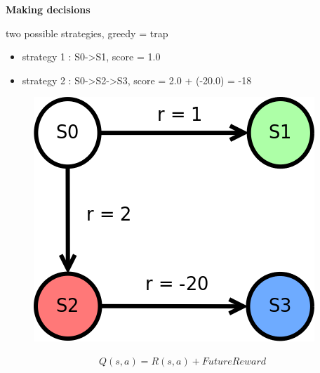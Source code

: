 \documentclass[xcolor=dvipsnames]{beamer}
\begin{document}
\begin{frame}{\bf Making decisions}

two possible strategies, {\color{red} greedy = trap}
\begin{itemize}
  \item strategy 1 : S0->S1, score = 1.0
  \item strategy 2 : S0->S2->S3, score = 2.0 + (-20.0) = -18
\end{itemize}

  \begin{figure}
    \includegraphics[scale=0.4]{../../diagrams/rl_trivial_trap.png}
  \end{figure}

  \begin{align*}
    Q(s, a) = R(s, a) + FutureReward
  \end{align*}

\end{frame}
\end{document}
